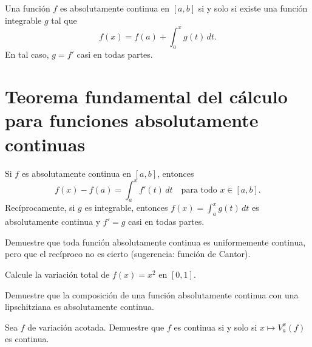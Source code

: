 \begin{theorem}
\label{teo:carac-ac}
Una función $f$ es absolutamente continua en $[a,b]$ si y solo si existe una función integrable $g$ tal que
\[
  f(x)=f(a)+\int_a^x g(t)\,dt.
\]
En tal caso, $g=f'$ casi en todas partes.
\end{theorem}

\section{Teorema fundamental del cálculo para funciones absolutamente continuas}

\begin{theorem}
\label{teo:fundamental-ac}
Si $f$ es absolutamente continua en $[a,b]$, entonces
\[
  f(x)-f(a)=\int_a^x f'(t)\,dt\quad\text{para todo }x\in[a,b].
\]
Recíprocamente, si $g$ es integrable, entonces $f(x)=\int_a^x g(t)\,dt$ es absolutamente continua y $f'=g$ casi en todas partes.
\end{theorem}

\begin{exercise}
Demuestre que toda función absolutamente continua es uniformemente continua, pero que el recíproco no es cierto (sugerencia: función de Cantor).
\end{exercise}

\begin{exercise}
Calcule la variación total de $f(x)=x^2$ en $[0,1]$.
\end{exercise}

\begin{exercise}
Demuestre que la composición de una función absolutamente continua con una lipschitziana es absolutamente continua.
\end{exercise}

\begin{problem}
Sea $f$ de variación acotada. Demuestre que $f$ es continua si y solo si $x\mapsto V_a^x(f)$ es continua.
\end{problem}
